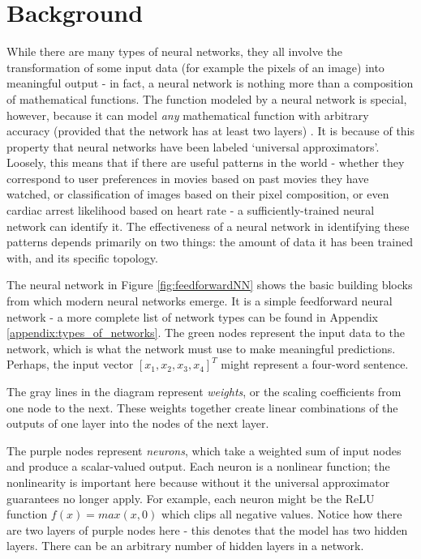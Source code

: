 \documentclass[12pt,letterpaper]{article}
\begin{document}
\section{Background}
While there are many types of neural networks, they all involve the transformation of some input data (for example the pixels of an image) into meaningful output - in fact, a neural network is nothing more than a composition of mathematical functions. The function modeled by a neural network is special, however, because it can model \textit{any} mathematical function with arbitrary accuracy (provided that the network has at least two layers) \cite{dnn_history}. It is because of this property that neural networks have been labeled \enquote*{universal approximators}. Loosely, this means that if there are useful patterns in the world - whether they correspond to user preferences in movies based on past movies they have watched, or classification of images based on their pixel composition, or even cardiac arrest likelihood based on heart rate - a sufficiently-trained neural network can identify it. The effectiveness of a neural network in identifying these patterns depends primarily on two things: the amount of data it has been trained with, and its specific topology.
\par

The neural network in Figure \ref{fig:feedforwardNN} shows the basic building blocks from which modern neural networks emerge. It is a simple feedforward neural network - a more complete list of network types can be found in Appendix \ref{appendix:types_of_networks}. The green nodes represent the input data to the network, which is what the network must use to make meaningful predictions. Perhaps, the input vector $[x_1,x_2,x_3,x_4]^T$ might represent a four-word sentence.\par

The gray lines in the diagram represent \textit{weights}, or the scaling coefficients from one node to the next. These weights together create linear combinations of the outputs of one layer into the nodes of the next layer. \par 

The purple nodes represent \textit{neurons}, which take a weighted sum of input nodes and produce a scalar-valued output. Each neuron is a nonlinear function; the nonlinearity is important here because without it the universal approximator guarantees no longer apply. For example, each neuron might be the ReLU function $f(x)=max(x,0)$ which clips all negative values. Notice how there are two layers of purple nodes here - this denotes that the model has two hidden layers. There can be an arbitrary number of hidden layers in a network. \par 
\end{document}
